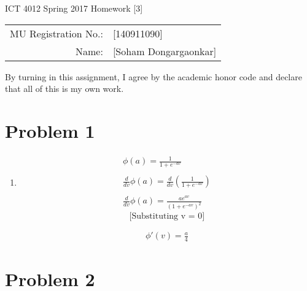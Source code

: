 \documentclass[12pt]{article}
\begin{document}
\begin{center}
{\Large ICT 4012 Spring 2017 Homework [3]} %

\begin{tabular}{rl}
MU Registration No.: & [140911090] \\  %
Name: & [Soham Dongargaonkar] \\   %
\end{tabular}
\end{center}

By turning in this assignment, I agree by the academic honor code and declare that all of this is my own work.

\section*{Problem 1}

\begin{enumerate}
    \item \begin{gather}
                \phi(a) =  \frac{1}{1+e^{-av}} \nonumber\\ \nonumber\\
                \frac{d}{dv}\phi(a) = \frac{d}{dv}(\frac{1}{1+e^{-av}})\nonumber\\\nonumber\\
                \frac{d}{dv}\phi(a) = \frac{ae^{av}}{(1+e^{-av})^2} \label{eqn:1}
            \end{gather}
            \[ 
                \text{[Substituting\ v = 0]} 
            \]
             
            \begin{gather}
                \phi'(v) = \frac{a}{4}
            \end{gather}  
               

   
\end{enumerate}

\section*{Problem 2}
\end{document}
